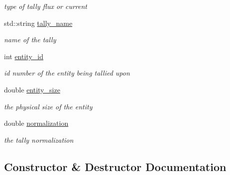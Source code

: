 \begin{DoxyCompactItemize}
\begin{DoxyCompactList}\small\item\em type of tally flux or current \end{DoxyCompactList}\item 
\mbox{\label{classpyne_1_1_tally_af5e75c809e337a06d26636020d3f1809}} 
std\+::string \hyperlink{classpyne_1_1_tally_af5e75c809e337a06d26636020d3f1809}{tally\+\_\+name}
\begin{DoxyCompactList}\small\item\em name of the tally \end{DoxyCompactList}\item 
\mbox{\label{classpyne_1_1_tally_a84aa789b361f4323e2906a411ef3a791}} 
int \hyperlink{classpyne_1_1_tally_a84aa789b361f4323e2906a411ef3a791}{entity\+\_\+id}
\begin{DoxyCompactList}\small\item\em id number of the entity being tallied upon \end{DoxyCompactList}\item 
\mbox{\label{classpyne_1_1_tally_a1a19c1b79ed25ea2a3d08b15b30bbea1}} 
double \hyperlink{classpyne_1_1_tally_a1a19c1b79ed25ea2a3d08b15b30bbea1}{entity\+\_\+size}
\begin{DoxyCompactList}\small\item\em the physical size of the entity \end{DoxyCompactList}\item 
\mbox{\label{classpyne_1_1_tally_a8ff1eb44926ad1e415386983679c78f1}} 
double \hyperlink{classpyne_1_1_tally_a8ff1eb44926ad1e415386983679c78f1}{normalization}
\begin{DoxyCompactList}\small\item\em the tally normalization \end{DoxyCompactList}\end{DoxyCompactItemize}


\subsection{Constructor \& Destructor Documentation}
\mbox{\label{classpyne_1_1_tally_a882081e3a6f1628d1b7941003d5ccfad}} 
